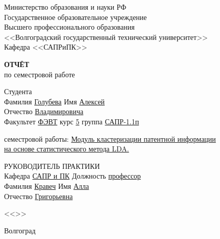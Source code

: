 \documentclass[a4paper, 14pt]{extreport}
\begin{document}
    \begin{titlepage}
        \begin{center}
            Министерство образования и науки РФ \\
            Государственное образовательное учреждение\\
            Высшего профессионального образования\\
            <<Волгоградский государственный технический университет>>\\
            Кафедра <<САПРиПК>>
        \end{center}
        \vspace{2.0cm}
        \begin{center}
            \large \textbf{ОТЧЁТ} \\
            по семестровой работе
        \end{center}
        \begin{flushleft}
            Студента\\
            Фамилия \underline{Голубева} 
            Имя \underline{Алексей}\\
            Отчество \underline{Владимировича}\\
            Факультет \underline{ФЭВТ} курс \underline{5} группа \underline{САПР-1.1п}
        \end{flushleft}
        \vspace{1.0cm}
         семестровой работы: \underline{Модуль кластеризации патентной информации}\\
        \underline{на основе статистического метода LDA.}
        \vspace{2.0cm}
        \begin{flushleft}
            РУКОВОДИТЕЛЬ ПРАКТИКИ\\
            Кафедра \underline{САПР и ПК} Должность \underline{профессор} \\
            Фамилия \underline{Кравеч} Имя \underline{Алла}\\
            Отчество \underline{Григорьевна}
        \end{flushleft}
        \vspace{1.5cm}
        \begin{flushright}
            <<\underline{\hspace{1.0cm}}>>\underline{\hspace{5.0cm}} \the\year
        \end{flushright}
        \vspace{\fill}
        \begin{center}
            Волгоград \the\year
        \end{center}
    \end{titlepage}
    \tableofcontents
    \newpage
    \onehalfspacing
    
\end{document}
